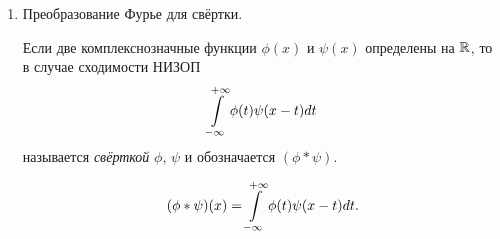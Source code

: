 \documentclass[../../main.tex]{subfiles}
\begin{document}
\begin{enumerate}
\begin{proof}
    Т.~к. производная $f'$ абсолютно интегрируема, то тем самым получаем, что 
    \[\exists p = \lim_{x \to \infty} f(x) \stackrel{\eqref{lec21:28}}{=} 
    \lim_{x \to \infty}\left(f(0) 
    + \int\limits_{0}^{x}f'(t)dt \right) \in \R.\]
    Покажем, что $p = 0$. Если предположить, что, например, $p >0$, то для 
    всех 
    достаточно больших $x \in \R \implies |f(x)| \geq \frac p2$, а тогда 
    $\ipminf |f(x)|dx$ расходится по признаку сравнения. Поэтому $|p| = 0 
    \implies p = 0$.
    Таким образом,
    \[ \lim_{x \to +\infty} f(x) = 0.\]
    Аналогично доказывается, что
    \[ \lim_{x \to -\infty} f(x) = 0.\]
    Отсюда, в силу формулы интегрирования по частям, получаем
    \begin{multline*}
      F[f'](y) = \frac{1}{\sqrt{2\pi}} \ipminf f'(t)e^{ity}dt = 
      \frac{1}{\sqrt{2\pi}} \ipminf e^{iyt}d(f(t)) =\\= \frac{1}{\sqrt{2\pi}} 
      \left(f(t) e^{iyt}\bigg|_{t = -\infty}^{t = +\infty} \right) - 
      \frac{1}{\sqrt{2\pi}} \ipminf f(t)f(e^{iyt}) = -iyF(y).
    \end{multline*}
  \end{proof}
  
  \item Преобразование Фурье для свёртки.
  
  Если две комплекснозначные функции $\phi(x)$ и $\psi(x)$ определены 
  на $\mathbb{R}$, то в случае сходимости НИЗОП
  \[ \int\limits_{-\infty}^{+\infty} \phi(t)\psi(x - t)dt \]
  называется \emph{свёрткой} $\phi, \, \psi$ и обозначается $(\phi * \psi)$.
  
  \begin{equation}
    \label{lec21:29}
    (\phi * \psi)(x) = \int\limits_{-\infty}^{+\infty} \phi(t)\psi(x - t)dt.
  \end{equation}
\end{enumerate}
\end{document}
